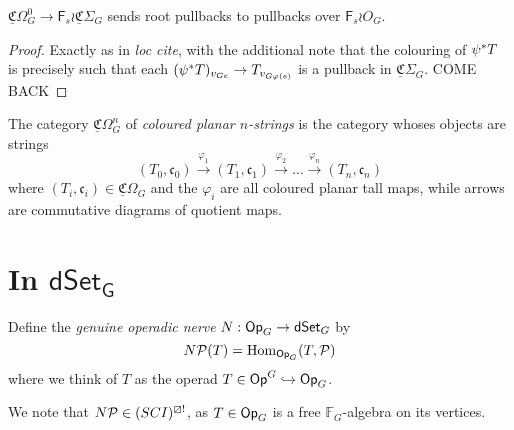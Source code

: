 \documentclass[psamsfonts,onesided,10pt
,draft
]{amsart}%
\renewcommand{\phi}{\varphi}
\newcommand{\UC}{\underline{\mathfrak C}}
\begin{document}
\begin{lemma}[{cf. \cite[Lemma 3.63]{BP17}}]
      $\underline{\mathfrak C}\Omega_G^0 \to \mathsf F_s \wr \underline{\mathfrak C}\Sigma_G$
      sends root pullbacks to pullbacks over $\mathsf F_s \wr O_G$.
\end{lemma}
\begin{proof}
      Exactly as in \textit{loc cite}, with the additional note that
      the colouring of $\psi^{\**}T$ is precisely such that each $(\psi^{\**}T)_{v_{Ge}} \to T_{v_{G\phi(e)}}$
      is a pullback in $\UC \Sigma_G$.  COME BACK
\end{proof}

\begin{definition}
      The category $\UC\Omega_G^n$ of \textit{coloured planar $n$-strings} is the category
      whoses objects are strings
      \begin{equation}
            (T_0,\mathfrak c_0)
            \xrightarrow{\phi_1} (T_1, \mathfrak c_1)
            \xrightarrow{\phi_2} \ldots
            \xrightarrow{\phi_n} (T_n, \mathfrak c_n)
      \end{equation}
      where $(T_i, \mathfrak c_i) \in \UC\Omega_G$ and the $\phi_i$ are all coloured planar tall maps,
      while arrows are commutative diagrams of quotient maps.
\end{definition}
\newpage

\section{In $\mathsf{dSet_G}$}

\begin{definition}
      Define the \textit{genuine operadic nerve} $N: \Op_G \to \dSet_G$ by
      \begin{equation}
            N\P(T) = \Hom_{\Op_G}(T, \P)
      \end{equation}
      where we think of $T$ as the operad $T \in \Op^G \into \Op_G$. 
\end{definition}

\begin{remark}
      We note that $N\P \in (SCI)^{\boxslash !}$,
      as $T \in \Op_G$ is a free $\mathbb F_G$-algebra on its vertices.
\end{remark}
\end{document}
